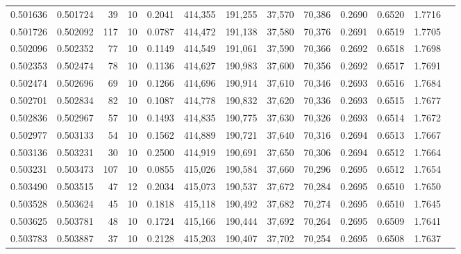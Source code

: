 \begin{tabular}{rrrrrrrrrrrrr}
0.501636 & 0.501724 &    39 &  10 &                                     0.2041 & 414,355 & 191,255 &  37,570 &  70,386 & 0.2690 & 0.6520 & 1.7716 \\
0.501726 & 0.502092 &   117 &  10 &                                     0.0787 & 414,472 & 191,138 &  37,580 &  70,376 & 0.2691 & 0.6519 & 1.7705 \\
0.502096 & 0.502352 &    77 &  10 &                                     0.1149 & 414,549 & 191,061 &  37,590 &  70,366 & 0.2692 & 0.6518 & 1.7698 \\
0.502353 & 0.502474 &    78 &  10 &                                     0.1136 & 414,627 & 190,983 &  37,600 &  70,356 & 0.2692 & 0.6517 & 1.7691 \\
0.502474 & 0.502696 &    69 &  10 &                                     0.1266 & 414,696 & 190,914 &  37,610 &  70,346 & 0.2693 & 0.6516 & 1.7684 \\
0.502701 & 0.502834 &    82 &  10 &                                     0.1087 & 414,778 & 190,832 &  37,620 &  70,336 & 0.2693 & 0.6515 & 1.7677 \\
0.502836 & 0.502967 &    57 &  10 &                                     0.1493 & 414,835 & 190,775 &  37,630 &  70,326 & 0.2693 & 0.6514 & 1.7672 \\
0.502977 & 0.503133 &    54 &  10 &                                     0.1562 & 414,889 & 190,721 &  37,640 &  70,316 & 0.2694 & 0.6513 & 1.7667 \\
0.503136 & 0.503231 &    30 &  10 &                                     0.2500 & 414,919 & 190,691 &  37,650 &  70,306 & 0.2694 & 0.6512 & 1.7664 \\
0.503231 & 0.503473 &   107 &  10 &                                     0.0855 & 415,026 & 190,584 &  37,660 &  70,296 & 0.2695 & 0.6512 & 1.7654 \\
0.503490 & 0.503515 &    47 &  12 &                                     0.2034 & 415,073 & 190,537 &  37,672 &  70,284 & 0.2695 & 0.6510 & 1.7650 \\
0.503528 & 0.503624 &    45 &  10 &                                     0.1818 & 415,118 & 190,492 &  37,682 &  70,274 & 0.2695 & 0.6510 & 1.7645 \\
0.503625 & 0.503781 &    48 &  10 &                                     0.1724 & 415,166 & 190,444 &  37,692 &  70,264 & 0.2695 & 0.6509 & 1.7641 \\
0.503783 & 0.503887 &    37 &  10 &                                     0.2128 & 415,203 & 190,407 &  37,702 &  70,254 & 0.2695 & 0.6508 & 1.7637 \\

\end{tabular}
